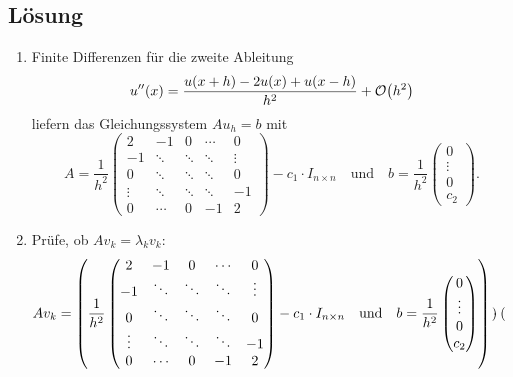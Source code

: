 \documentclass{exercise}
\begin{document}
    \subsection*{Lösung}
    \begin{enumerate}
        \item Finite Differenzen für die zweite Ableitung
        \[
            u''\parentheses*{x} = \frac{u\parentheses*{x + h} - 2u\parentheses*{x} + u\parentheses*{x - h}}{h^2} + \mathcal{O}\parentheses*{h^2}
        \]
        liefern das Gleichungssystem \(Au_h = b\) mit
        \[
            A = \frac{1}{h^2}\begin{pmatrix}
                2 & -1 & 0 & \cdots & 0\\
                -1 & \ddots & \ddots & \ddots & \vdots\\
                0 & \ddots & \ddots & \ddots & 0\\
                \vdots & \ddots & \ddots & \ddots & -1\\
                0 & \cdots & 0 & -1 & 2
            \end{pmatrix} - c_1 \cdot I_{n \times n} \quad \text{und} \quad b = \frac{1}{h^2}\begin{pmatrix}
                0\\\vdots\\0\\c_2
            \end{pmatrix}.
        \]
        \item Prüfe, ob \(Av_k = \lambda_k v_k\):
        \begin{align*}
            Av_k &= \parentheses*{\frac{1}{h^2}\begin{pmatrix}
                2 & -1 & 0 & \cdots & 0\\
                -1 & \ddots & \ddots & \ddots & \vdots\\
                0 & \ddots & \ddots & \ddots & 0\\
                \vdots & \ddots & \ddots & \ddots & -1\\
                0 & \cdots & 0 & -1 & 2
            \end{pmatrix} - c_1 \cdot I_{n \times n} \quad \text{und} \quad b = \frac{1}{h^2}\begin{pmatrix}
                0\\
                \vdots\\
                0\\
                c_2
            \end{pmatrix}} \cdot \begin{pmatrix}

\end{pmatrix}
\end{align*}
\end{enumerate}
\end{document}
